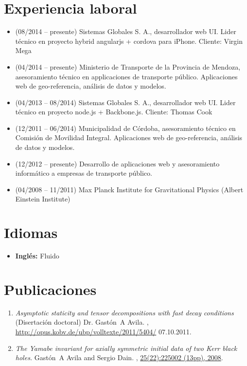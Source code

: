 \documentclass[a4paper]{article}
\begin{document}
\section{Experiencia laboral}
\begin{itemize}
 \item (08/2014 -- presente) Sistemas Globales S. A., desarrollador web UI. 
Lider técnico en proyecto hybrid angularjs + cordova para iPhone. Cliente: Virgin Mega
 \item (04/2014 -- presente) Ministerio de Transporte de la Provincia de Mendoza, 
 asesoramiento técnico en applicaciones de transporte público. Aplicaciones web de geo-referencia, análisis de
datos y modelos.
 \item (04/2013 -- 08/2014) Sistemas Globales S. A., desarrollador web UI. 
Lider técnico en proyecto node.js + Backbone.js. Cliente: Thomas Cook
 \item (12/2011 -- 06/2014) Municipalidad de Córdoba, asesoramiento técnico en 
 Comisión de Movilidad Integral. Aplicaciones web de geo-referencia, análisis de
datos y modelos.
\item (12/2012 -- presente) Desarrollo de aplicaciones web y asesoramiento 
 informático a empresas de transporte público. 
 \item (04/2008 -- 11/2011) Max Planck Institute for Gravitational Physics
(Albert Einstein Institute)
\end{itemize}

\section{Idiomas}
\begin{itemize}
 \item \textbf{Ingl\'es:} Fluido
\end{itemize}

\section{Publicaciones}
\begin{enumerate}
\item \newblock \emph{Asymptotic staticity and tensor decompositions with fast
decay conditions}
\newblock (Disertación doctoral)
\newblock Dr. Gast\'{o}n~A Avila.
,
\url{http://opus.kobv.de/ubp/volltexte/2011/5404/} 07.10.2011.
\item \newblock \emph{The Yamabe invariant for axially symmetric initial data of
two Kerr black holes.}
\newblock Gast\'{o}n~A Avila and Sergio Dain.
,
\href{http://dx.doi.org/10.1088/0264-9381/25/22/225002}{25(22):225002 (13pp),
2008}.
\end{enumerate}
\end{document}

